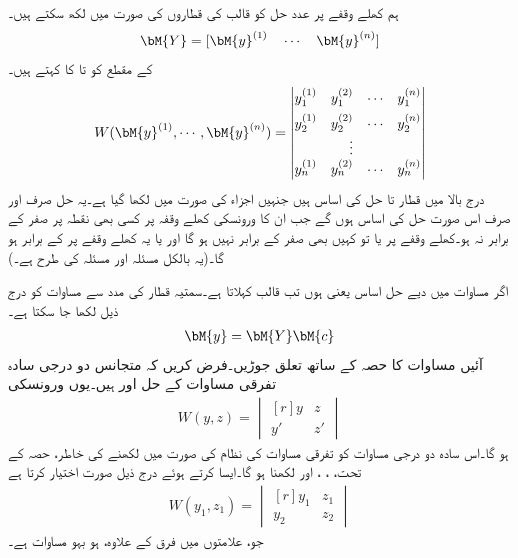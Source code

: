 ہم کھلے وقفے پر  عدد حل کو  قالب کی قطاروں کی صورت میں لکھ سکتے ہیں۔
\begin{align}\label{مساوات_نظام_ورونسکی_ب}
\bM{Y}=[\bM{y}^{(1)}\quad \cdots \quad \bM{y}^{(n)} ]
\end{align}
 کے  مقطع کو  تا  کا  کہتے ہیں۔
\begin{align}\label{مساوات_نظام_ورونسکی_پ}
W(\bM{y}^{(1)},\cdots,\bM{y}^{(n)})=
\begin{vmatrix*}[r]
y_1^{(1)}& y_1^{(2)} &\cdots&y_1^{(n)}\\[1ex]
y_2^{(1)}& y_2^{(2)} &\cdots&y_2^{(n)}\\
& \vdots & &\\
y_n^{(1)}& y_n^{(2)} &\cdots&y_n^{(n)}
\end{vmatrix*}
\end{align}
درج بالا  میں قطار   تا  حل کی اساس ہیں جنہیں اجزاء کی صورت میں لکھا گیا ہے۔یہ حل صرف اور صرف اس صورت حل کی اساس ہوں گے جب ان کا ورونسکی کھلے وقفہ  پر کسی بھی نقطہ  پر صفر کے برابر نہ ہو۔کھلے وقفے پر  یا تو کہیں بھی صفر کے برابر نہیں ہو گا اور یا یہ کھلے وقفے پر  کے برابر ہو گا۔(یہ بالکل مسئلہ  اور مسئلہ  کی طرح ہے۔)

اگر مساوات  میں دیے حل اساس یعنی   ہوں تب قالب   کہلاتا ہے۔سمتیہ قطار  کی مدد سے  مساوات  کو درج ذیل لکھا جا سکتا ہے۔
\begin{align}
\bM{y}=\bM{Y}\bM{c}
\end{align}
آئیں مساوات  کا حصہ  کے ساتھ تعلق جوڑیں۔فرض کریں کہ متجانس دو درجی سادہ تفرقی مساوات کے حل  اور  ہیں۔یوں ورونسکی
\begin{align*}
W(y,z)=
\begin{vmatrix*}[r]
y&z\\
y'&z'
\end{vmatrix*}
\end{align*}
ہو گا۔اس سادہ دو درجی مساوات کو تفرقی مساوات کی نظام کی صورت میں لکھنے کی خاطر، حصہ  کے تحت، ، ،  اور  لکھنا ہو گا۔ایسا کرتے ہوئے  درج ذیل صورت اختیار کرتا ہے
\begin{align*}
W(y_1,z_1)=
\begin{vmatrix*}[r]
y_1&z_1\\
y_2&z_2
\end{vmatrix*}
\end{align*}
جو، علامتوں میں فرق کے علاوہ، ہو بہو مساوات  ہے۔

